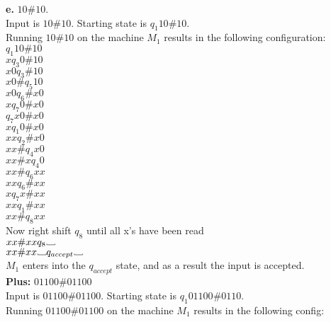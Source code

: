 \documentclass[12pt]{article}
\newcommand\Vtextvisiblespace[1][.8em]{%
	\mbox{\kern.07em\vrule height.3ex}%
	\vbox{\hrule width#1}%
	\hbox{\vrule height.3ex}}
\begin{document}
\pagebreak
\textbf{e.} $10\#10$. \\

Input is $10\#10$. Starting state is $q_1 10\#10$. \\
Running $10\#10$ on the machine $M_1$ results in the following configuration: \\

$            q_1 10 \# 10   $ \\
$x           q_3 0  \# 10   $ \\
$x0          q_3    \# 10   $ \\
$x0 \#       q_5       10   $ \\
$x0          q_6    \# x0   $ \\
$x           q_7  0 \# x0   $ \\
$            q_7 x0 \# x0   $ \\
$x           q_1  0 \# x0   $ \\
$xx          q_2    \# x0   $ \\
$xx \#       q_4       x0   $ \\
$xx \# x     q_4        0   $ \\
$xx \#       q_6       xx   $ \\
$xx          q_6    \# xx   $ \\
$x           q_7  x \# xx   $ \\
$xx          q_1    \# xx   $ \\
$xx \#       q_8       xx   $ \\
Now right shift $q_8$ until all x's have been read \\
$xx \# xx    q_8  \Vtextvisiblespace   $ \\
$xx \# xx         \Vtextvisiblespace q_{accept} \Vtextvisiblespace $ \\
$M_1$ enters into the $q_{accept}$ state, and as a result the input is accepted. \\

\pagebreak
\textbf{Plus:} $01100\#01100$ \\

Input is $01100\#01100$. Starting state is $q_1 01100\#0110$. \\
Running $01100\#01100$ on the machine $M_1$ results in the following config: \\
\end{document}
